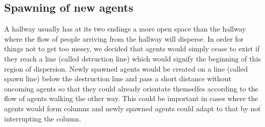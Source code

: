 \subsection{Spawning of new agents}
A hallway usually has at its two endings a more open space than the hallway where the flow of people arriving from the hallway will disperse. In order for things not to get too messy, we decided that agents would simply cease to exist if they reach a line (called dstruction line) which would signify the beginning of this region of dispersion. Newly spawned agents would be created on a line (called spawn line) below the destruction line and pass a short distance without oncoming agents so that they could already orientate themselfes according to the flow of agents walking the other way. This could be important in cases where the agents would form columns and newly spawned agents could adapt to that by not interrupting the column.


